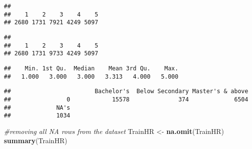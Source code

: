 \documentclass[
]{article}
\newenvironment{Shaded}{\begin{snugshade}}{\end{snugshade}}
\newcommand{\CommentTok}[1]{\textcolor[rgb]{0.56,0.35,0.01}{\textit{#1}}}
\newcommand{\DecValTok}[1]{\textcolor[rgb]{0.00,0.00,0.81}{#1}}
\newcommand{\KeywordTok}[1]{\textcolor[rgb]{0.13,0.29,0.53}{\textbf{#1}}}
\newcommand{\NormalTok}[1]{#1}
\newcommand{\OperatorTok}[1]{\textcolor[rgb]{0.81,0.36,0.00}{\textbf{#1}}}
\newcommand{\OtherTok}[1]{\textcolor[rgb]{0.56,0.35,0.01}{#1}}
\newcommand{\StringTok}[1]{\textcolor[rgb]{0.31,0.60,0.02}{#1}}
\begin{document}
\begin{verbatim}
## 
##    1    2    3    4    5 
## 2680 1731 7921 4249 5097
\end{verbatim}

\begin{Shaded}
\end{Shaded}

\begin{verbatim}
## 
##    1    2    3    4    5 
## 2680 1731 9733 4249 5097
\end{verbatim}

\begin{Shaded}
\end{Shaded}

\begin{verbatim}
##    Min. 1st Qu.  Median    Mean 3rd Qu.    Max. 
##   1.000   3.000   3.000   3.313   4.000   5.000
\end{verbatim}

\begin{Shaded}
\end{Shaded}

\begin{verbatim}
##                        Bachelor's  Below Secondary Master's & above 
##                0            15578              374             6504 
##             NA's 
##             1034
\end{verbatim}

\begin{Shaded}
\begin{Highlighting}[]
\CommentTok{#removing all NA rows from the dataset}
\NormalTok{TrainHR <-}\StringTok{ }\KeywordTok{na.omit}\NormalTok{(TrainHR)}
\KeywordTok{summary}\NormalTok{(TrainHR)}
\end{Highlighting}
\end{Shaded}
\end{document}
